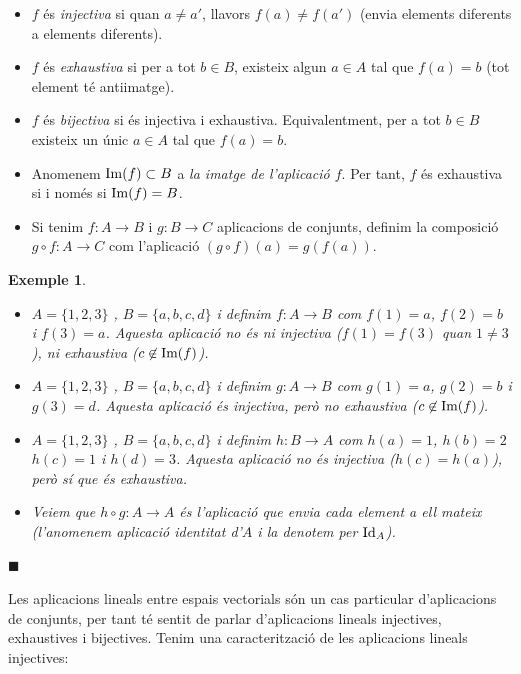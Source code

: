 \documentclass[
  11pt,
]{book}
\numberwithin{dummy}{section}
\theoremstyle{maincolornumbox}
\theoremstyle{blacknumex}
\newtheorem{exampleT}{Exemple}[chapter]
\theoremstyle{blacknumbox}
\theoremstyle{maincolornum}
\newenvironment{example}{\begin{exampleT}}{\hfill{\tiny\ensuremath{\blacksquare}}\end{exampleT}}
\newlength\esp
\begin{document}
\begin{itemize}
\item
  \(f\) és \emph{injectiva} si quan \(a\neq a'\), llavors \(f(a)\neq f(a')\)
  (envia elements diferents a elements diferents).
\item
  \(f\) és \emph{exhaustiva} si per a tot \(b\in B\), existeix algun \(a\in A\)
  tal que \(f(a)=b\) (tot element té antiimatge).
\item
  \(f\) és \emph{bijectiva} si és injectiva i exhaustiva. Equivalentment, per
  a tot \(b\in B\) existeix un únic \(a\in A\) tal que \(f(a)=b\).
\item
  Anomenem \(\operatorname{Im}(f)\subset B\) a \emph{la imatge de l'aplicació \(f\)}. Per
  tant, \(f\) és exhaustiva si i només si \(\operatorname{Im}(f)=B\).
\item
  Si tenim \(f\colon A \to B\) i \(g\colon B \to C\) aplicacions de
  conjunts, definim la composició \(g\circ f \colon A \to C\) com
  l'aplicació \((g\circ f)(a)=g(f(a))\).
\end{itemize}

\begin{example}
\leavevmode

\begin{itemize}
\item
  \(A=\{1,2,3\}\) , \(B=\{a,b,c,d\}\) i definim \(f\colon A \to B\) com
  \(f(1)=a\), \(f(2)=b\) i \(f(3)=a\). Aquesta aplicació no és ni injectiva
  (\(f(1)=f(3)\) quan \(1\neq 3\)), ni exhaustiva (\(c\not\in \operatorname{Im}(f)\)).
\item
  \(A=\{1,2,3\}\) , \(B=\{a,b,c,d\}\) i definim \(g\colon A \to B\) com
  \(g(1)=a\), \(g(2)=b\) i \(g(3)=d\). Aquesta aplicació és injectiva, però
  no exhaustiva (\(c\not\in \operatorname{Im}(f)\)).
\item
  \(A=\{1,2,3\}\) , \(B=\{a,b,c,d\}\) i definim \(h\colon B \to A\) com
  \(h(a)=1\), \(h(b)=2\) \(h(c)=1\) i \(h(d)=3\). Aquesta aplicació no és
  injectiva (\(h(c)=h(a)\)), però sí que és exhaustiva.
\item
  Veiem que \(h\circ g \colon A \to A\) és l'aplicació que envia cada
  element a ell mateix (l'anomenem aplicació identitat d'\(A\) i la
  denotem per \(\operatorname{Id}_A\)).
\end{itemize}

\end{example}

Les aplicacions lineals entre espais vectorials són un cas particular
d'aplicacions de conjunts, per tant té sentit de parlar d'aplicacions
lineals injectives, exhaustives i bijectives. Tenim una caracterització
de les aplicacions lineals injectives:
\end{document}
